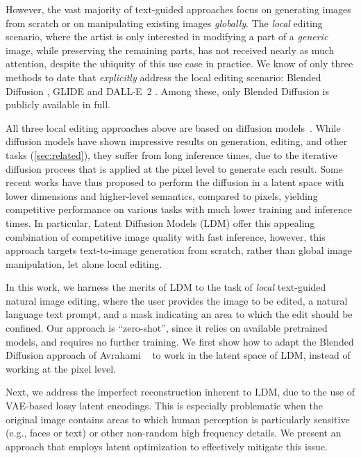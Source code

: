 However, the vast majority of text-guided approaches focus on generating images from scratch or on manipulating existing images \emph{globally}.
The \emph{local} editing scenario, where the artist is only interested in modifying a part of a \emph{generic} image, while preserving the remaining parts, has not received nearly as much attention, despite the ubiquity of this use case in practice. We know of only three methods to date that \emph{explicitly} address the local editing scenario: Blended Diffusion \cite{avrahami2022blended}, GLIDE \cite{nichol2021glide} and {DALL$\cdot$E}~2 \cite{ramesh2022hierarchical}. Among these, only Blended Diffusion is publicly available in full.

All three local editing approaches above are based on diffusion models~\cite{sohl2015deep,nichol2021improved, ho2020denoising}. While diffusion models have shown impressive results on generation, editing, and other tasks (\ref{sec:related}), they suffer from long inference times, due to the iterative diffusion process that is applied at the pixel level to generate each result. Some recent works \cite{rombach2021high, gu2021vector, esser2021imagebart, bond2021unleashing, hu2021global, vahdat2021score} have thus proposed to perform the diffusion in a latent space with lower dimensions and higher-level semantics, compared to pixels, yielding competitive performance on various tasks with much lower training and inference times. In particular, Latent Diffusion Models (LDM) \cite{rombach2021high} offer this appealing combination of competitive image quality with fast inference, however, this approach targets text-to-image generation from scratch, rather than global image manipulation, let alone local editing.

In this work, we harness the merits of LDM to the task of \emph{local} text-guided natural image editing, where the user provides the image to be edited, a natural language text prompt, and a mask indicating an area to which the edit should be confined. Our approach is ``zero-shot'', since it relies on available pretrained models, and requires no further training. We first show how to adapt the Blended Diffusion approach of Avrahami \etal~ to work in the latent space of LDM, instead of working at the pixel level.

Next, we address the imperfect reconstruction inherent to LDM, due to the use of VAE-based lossy latent encodings. This is especially problematic when the original image contains areas to which human perception is particularly sensitive (e.g., faces or text) or other non-random high frequency details. We present an approach that employs latent optimization to effectively mitigate this issue.

